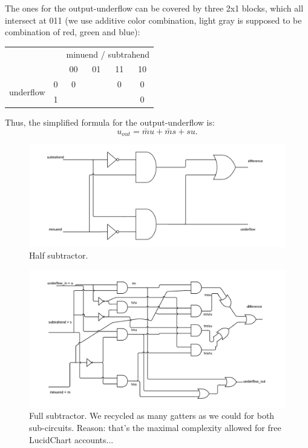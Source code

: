\documentclass[10pt,a4paper]{scrartcl}
\newcommand{\subExercise}[1]{\vspace{0.5em} \noindent{\bf #1)}}
\begin{document}
The ones for the output-underflow can be covered by
three 2x1 blocks, which all intersect at 011 (we use additive color combination,
light gray is supposed to be combination of red, green and blue):
\vspace{0.5em}
\begin{tabular}{|c c|c c c c|}
  \hline 
    & & \multicolumn{4}{c|}{minuend / subtrahend} \\
    & & 00 & 01 & 11 & 10 \\
  \hline
    \multirow{2}{*}{underflow} & 0 & 0 & \cellcolor{green}{1} & 0 & 0 \\
                               & 1 & \cellcolor{red}{1} & \cellcolor{lightgray}{1} & \cellcolor{blue}{1} & 0 \\
  \hline
\end{tabular}

Thus, the simplified formula for the output-underflow is:
\[
u_{out} = \bar m u + \bar m s + su.
\]

\subExercise{d}

\vspace{1em}
\begin{figure}[h]
  \centering\includegraphics[width=0.75\linewidth]{images/halfSubtractor.png}
  \caption{Half subtractor.}
\end{figure}
\vspace{1em}

\vspace{1em}
\begin{figure}[h]
  \centering\includegraphics[width=0.75\linewidth]{images/fullSubtractor.png}
  \caption{Full subtractor. We recycled as many gatters as we could for both sub-circuits. Reason: that's the maximal complexity allowed for free LucidChart accounts...}
\end{figure}
\vspace{1em}
\end{document}

